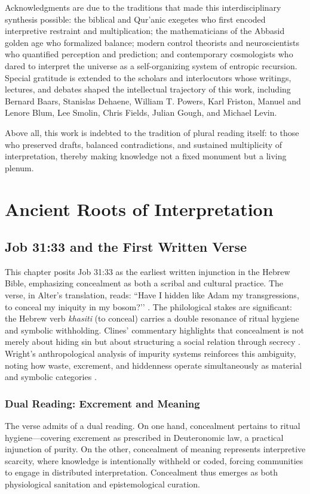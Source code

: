 \documentclass[a4paper,11pt,openany]{book}
\begin{document}
Acknowledgments are due to the traditions that made this interdisciplinary synthesis possible: the biblical and Qur'anic exegetes who first encoded interpretive restraint and multiplication; the mathematicians of the Abbasid golden age who formalized balance; modern control theorists and neuroscientists who quantified perception and prediction; and contemporary cosmologists who dared to interpret the universe as a self-organizing system of entropic recursion. Special gratitude is extended to the scholars and interlocutors whose writings, lectures, and debates shaped the intellectual trajectory of this work, including Bernard Baars, Stanislas Dehaene, William T. Powers, Karl Friston, Manuel and Lenore Blum, Lee Smolin, Chris Fields, Julian Gough, and Michael Levin. 

Above all, this work is indebted to the tradition of plural reading itself: to those who preserved drafts, balanced contradictions, and sustained multiplicity of interpretation, thereby making knowledge not a fixed monument but a living plenum.


\tableofcontents
\newpage

\part{Ancient Roots of Interpretation}
 
\chapter{Job 31:33 and the First Written Verse}

This chapter posits Job 31:33 as the earliest written injunction in the Hebrew Bible, emphasizing concealment as both a scribal and cultural practice. The verse, in Alter’s translation, reads: ``Have I hidden like Adam my transgressions, to conceal my iniquity in my bosom?’’ \citep{alter2010wisdom}. The philological stakes are significant: the Hebrew verb \textit{khasiti} (to conceal) carries a double resonance of ritual hygiene and symbolic withholding. Clines’ commentary highlights that concealment is not merely about hiding sin but about structuring a social relation through secrecy \citep{clines1989job}. Wright’s anthropological analysis of impurity systems reinforces this ambiguity, noting how waste, excrement, and hiddenness operate simultaneously as material and symbolic categories \citep{wright2001impurity}.

\section{Dual Reading: Excrement and Meaning}
The verse admits of a dual reading. On one hand, concealment pertains to ritual hygiene—covering excrement as prescribed in Deuteronomic law, a practical injunction of purity. On the other, concealment of meaning represents interpretive scarcity, where knowledge is intentionally withheld or coded, forcing communities to engage in distributed interpretation. Concealment thus emerges as both physiological sanitation and epistemological curation.
\end{document}

